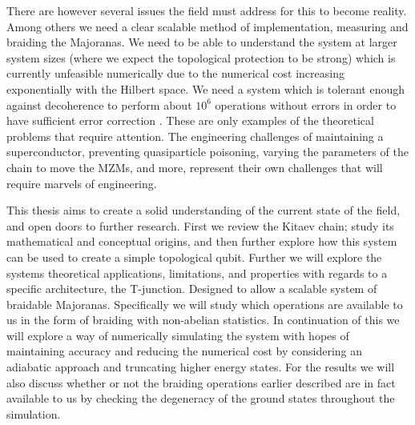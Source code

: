 There are however several issues the field must address for this to become reality. Among others we need a clear scalable method of implementation, measuring and braiding the Majoranas. We need to be able to understand the system at larger system sizes (where we expect the topological protection to be strong) which is currently unfeasible numerically due to the numerical cost increasing exponentially with the Hilbert space. We need a system which is tolerant enough against decoherence to perform about $10^6$ operations without errors in order to have sufficient error correction \cite{aharonovFaultTolerantQuantumComputation1999}. These are only examples of the theoretical problems that require attention. The engineering challenges of maintaining a superconductor, preventing quasiparticle poisoning, varying the parameters of the chain to move the MZMs, and more, represent their own challenges that will require marvels of engineering.

This thesis aims to create a solid understanding of the current state of the field, and open doors to further research. First we review the Kitaev chain; study its mathematical and conceptual origins, and then further explore how this system can be used to create a simple topological qubit. Further we will explore the systems theoretical applications, limitations, and properties with regards to a specific architecture, the T-junction. Designed to allow a scalable system of braidable Majoranas. Specifically we will study which operations are available to us in the form of braiding with non-abelian statistics. In continuation of this we will explore a way of numerically simulating the system with hopes of maintaining accuracy and reducing the numerical cost by considering an adiabatic approach and truncating higher energy states. For the results we will also discuss whether or not the braiding operations earlier described are in fact available to us by checking the degeneracy of the ground states throughout the simulation.





